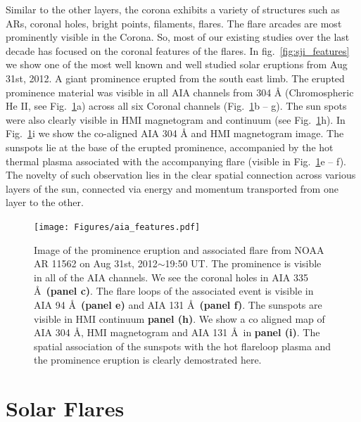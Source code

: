 Similar to the other layers, the corona exhibits a variety of structures such as ARs, coronal holes, bright points, filaments, flares. The flare arcades are most prominently visible in the Corona. So, most of our existing studies over the last decade has focused on the coronal features of the flares. In fig.~\ref{fig:sji_features} we show one of the most well known and well studied solar eruptions from Aug 31st, 2012. A giant prominence erupted from the south east limb. The erupted prominence material was visible in all AIA channels from 304 {\AA} (Chromospheric He II, see Fig.~\ref{fig:aia-feature}a) across all six Coronal channels (Fig.~\ref{fig:aia-feature}b {--} g). The sun spots were also clearly visible in HMI magnetogram and continuum (see Fig.~\ref{fig:aia-feature}h). In Fig.~\ref{fig:aia-feature}i we show the co-aligned AIA 304 {\AA} and HMI magnetogram image. The sunspots lie at the base of the erupted prominence, accompanied by the hot thermal plasma associated with the accompanying flare (visible in Fig.~\ref{fig:aia-feature}e {--} f). The novelty of such observation lies in the clear spatial connection across various layers of the sun, connected via energy and momentum transported from one layer to the other. 

\begin{figure}[ht!]
    \centering
    \texttt{[image: Figures/aia\_features.pdf]}
    \caption{Image of the prominence eruption and associated flare from NOAA AR 11562 on Aug 31st, 2012$\sim$19:50 UT. The prominence is visible in all of the AIA channels. We see the coronal holes in AIA 335 \AA~\textbf{(panel c)}. The flare loops of the associated event is visible in AIA 94 \AA~\textbf{(panel e)} and AIA 131 \AA~\textbf{(panel f)}. The sunspots are visible in HMI continuum \textbf{panel (h)}. We show a co aligned map of AIA 304 \AA, HMI magnetogram and AIA 131 \AA~in \textbf{panel (i)}. The spatial association of the sunspots with the hot flareloop plasma and the prominence eruption is clearly demostrated here. }
    \label{fig:aia-feature}
\end{figure}




\section{Solar Flares}\label{sol_flr}

